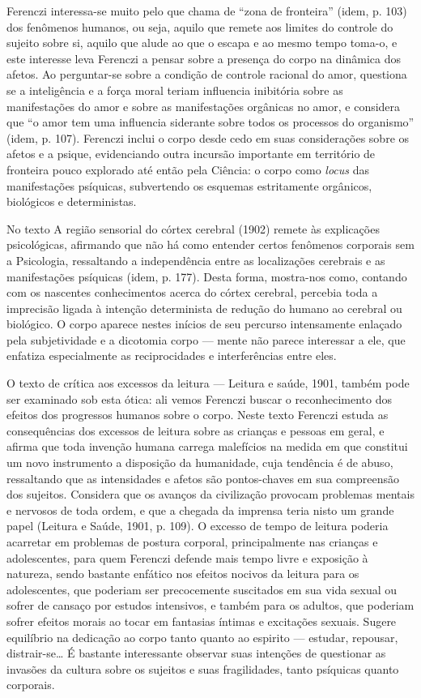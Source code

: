 Ferenczi interessa-se muito pelo que chama de ``zona de fronteira''
(idem, p. 103) dos fenômenos humanos, ou seja, aquilo que remete aos
limites do controle do sujeito sobre si, aquilo que alude ao que o
escapa e ao mesmo tempo toma-o, e este interesse leva Ferenczi a pensar
sobre a presença do corpo na dinâmica dos afetos. Ao perguntar-se sobre
a condição de controle racional do amor, questiona se a inteligência e a
força moral teriam influencia inibitória sobre as manifestações do amor
e sobre as manifestações orgânicas no amor, e considera que ``o amor tem
uma influencia siderante sobre todos os processos do organismo'' (idem,
p. 107). Ferenczi inclui o corpo desde cedo em suas considerações sobre
os afetos e a psique, evidenciando outra incursão importante em
território de fronteira pouco explorado até então pela Ciência: o corpo
como \emph{locus} das manifestações psíquicas, subvertendo os esquemas
estritamente orgânicos, biológicos e deterministas.

No texto A região sensorial do córtex cerebral (1902) remete às
explicações psicológicas, afirmando que não há como entender certos
fenômenos corporais sem a Psicologia, ressaltando a independência entre
as localizações cerebrais e as manifestações psíquicas (idem, p. 177).
Desta forma, mostra-nos como, contando com os nascentes conhecimentos
acerca do córtex cerebral, percebia toda a imprecisão ligada à intenção
determinista de redução do humano ao cerebral ou biológico. O corpo
aparece nestes inícios de seu percurso intensamente enlaçado pela
subjetividade e a dicotomia corpo --- mente não parece interessar a ele,
que enfatiza especialmente as reciprocidades e interferências entre
eles.

O texto de crítica aos excessos da leitura --- Leitura e saúde, 1901,
também pode ser examinado sob esta ótica: ali vemos Ferenczi buscar o
reconhecimento dos efeitos dos progressos humanos sobre o corpo. Neste
texto Ferenczi estuda as consequências dos excessos de leitura sobre as
crianças e pessoas em geral, e afirma que toda invenção humana carrega
malefícios na medida em que constitui um novo instrumento a disposição
da humanidade, cuja tendência é de abuso, ressaltando que as
intensidades e afetos são pontos-chaves em sua compreensão dos sujeitos.
Considera que os avanços da civilização provocam problemas mentais e
nervosos de toda ordem, e que a chegada da imprensa teria nisto um
grande papel (Leitura e Saúde, 1901, p. 109). O excesso de tempo de
leitura poderia acarretar em problemas de postura corporal,
principalmente nas crianças e adolescentes, para quem Ferenczi defende
mais tempo livre e exposição à natureza, sendo bastante enfático nos
efeitos nocivos da leitura para os adolescentes, que poderiam ser
precocemente suscitados em sua vida sexual ou sofrer de cansaço por
estudos intensivos, e também para os adultos, que poderiam sofrer
efeitos morais ao tocar em fantasias íntimas e excitações sexuais.
Sugere equilíbrio na dedicação ao corpo tanto quanto ao espirito ---
estudar, repousar, distrair-se\ldots{} É bastante interessante observar suas
intenções de questionar as invasões da cultura sobre os sujeitos e suas
fragilidades, tanto psíquicas quanto corporais.

